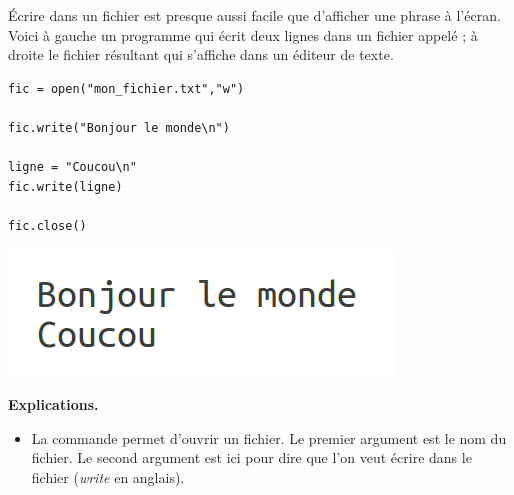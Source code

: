 \documentclass[11pt,class=report,crop=false]{standalone}
\begin{document}








\begin{cours}


\'Ecrire dans un fichier est presque aussi facile que d'afficher une phrase à l'écran.
Voici à gauche un programme qui écrit deux lignes dans un fichier appelé  ; à droite le fichier résultant qui s'affiche dans un éditeur de texte.
\begin{center}
\begin{minipage}{0.5\textwidth}
\begin{lstlisting}
fic = open("mon_fichier.txt","w")

fic.write("Bonjour le monde\n")

ligne = "Coucou\n"
fic.write(ligne)

fic.close()
\end{lstlisting}
\end{minipage}
\begin{minipage}{0.3\textwidth}
\includegraphics[scale=\myscale,scale=0.5]{ecran-fichiers-cours-1}
\end{minipage}
\end{center}


\textbf{Explications.}
\begin{itemize}
  \item La commande  permet d'ouvrir un fichier. Le premier argument est le nom du fichier. Le second argument est ici  pour dire que l'on veut écrire dans le fichier (\emph{write} en anglais).
  

\end{itemize}
\end{cours}
\end{document}

